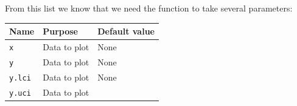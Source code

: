 \documentclass[12pt,a4paper]{book}
\theoremstyle{definition}
\theoremstyle{definition}
\theoremstyle{definition}
\theoremstyle{remark}
\begin{document}
From this list we know that we need the function to take several
parameters:

\begin{longtable}[]{@{}lll@{}}
\toprule
\begin{minipage}[b]{0.15\columnwidth}\raggedright
\textbf{Name}\strut
\end{minipage} & \begin{minipage}[b]{0.32\columnwidth}\raggedright
\textbf{Purpose}\strut
\end{minipage} & \begin{minipage}[b]{0.39\columnwidth}\raggedright
\textbf{Default value}\strut
\end{minipage}\tabularnewline
\midrule
\endhead
\begin{minipage}[t]{0.15\columnwidth}\raggedright
\texttt{x}\strut
\end{minipage} & \begin{minipage}[t]{0.32\columnwidth}\raggedright
Data to plot\strut
\end{minipage} & \begin{minipage}[t]{0.39\columnwidth}\raggedright
None\strut
\end{minipage}\tabularnewline
\begin{minipage}[t]{0.15\columnwidth}\raggedright
\texttt{y}\strut
\end{minipage} & \begin{minipage}[t]{0.32\columnwidth}\raggedright
Data to plot\strut
\end{minipage} & \begin{minipage}[t]{0.39\columnwidth}\raggedright
None\strut
\end{minipage}\tabularnewline
\begin{minipage}[t]{0.15\columnwidth}\raggedright
\texttt{y.lci}\strut
\end{minipage} & \begin{minipage}[t]{0.32\columnwidth}\raggedright
Data to plot\strut
\end{minipage} & \begin{minipage}[t]{0.39\columnwidth}\raggedright
None\strut
\end{minipage}\tabularnewline
\begin{minipage}[t]{0.15\columnwidth}\raggedright
\texttt{y.uci}\strut
\end{minipage} & \begin{minipage}[t]{0.32\columnwidth}\raggedright
Data to plot\strut
\end{minipage} & \begin{minipage}[t]{0.39\columnwidth}\raggedright

\end{minipage}
\end{longtable}
\end{document}
